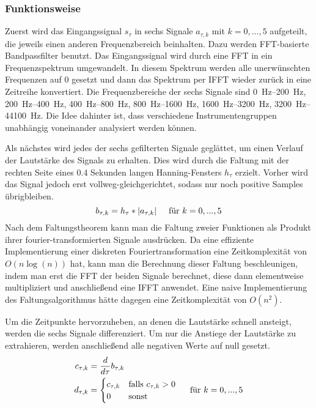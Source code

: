 {{		\subsubsection*{Funktionsweise}
		{
			Zuerst wird das Eingangssignal $s_\tau$ in sechs Signale $a_{\tau, k}$ mit $k = 0, ..., 5$ aufgeteilt,
				die jeweils einen anderen Frequenzbereich beinhalten.
			Dazu werden FFT-basierte Bandpassfilter benutzt.
			Das Eingangssignal wird durch eine FFT in ein Frequenzspektrum umgewandelt.
			In diesem Spektrum werden alle unerwünschten Frequenzen auf \num{0} gesetzt
				und dann das Spektrum per IFFT wieder zurück in eine Zeitreihe konvertiert.
			Die Frequenzbereiche der sechs Signale sind
				\SIrange{0}{200}{\hertz}, \SIrange{200}{400}{\hertz},
				\SIrange{400}{800}{\hertz}, \SIrange{800}{1600}{\hertz},
				\SIrange{1600}{3200}{\hertz}, \SIrange{3200}{44100}{\hertz}.
			Die Idee dahinter ist,
				dass verschiedene Instrumentengruppen unabhängig voneinander analysiert werden können.

			Als nächstes wird jedes der sechs gefilterten Signale geglättet,
				um einen Verlauf der Lautstärke des Signals zu erhalten.
			Dies wird durch die Faltung mit der rechten Seite eines \num{0.4} Sekunden langen Hanning-Fensters $h_\tau$ erzielt.
			Vorher wird das Signal jedoch erst vollweg-gleichgerichtet,
				sodass nur noch positive Samples übrigbleiben.
			\begin{equation}
				b_{\tau, k} = h_\tau * |a_{\tau, k}| \text{\hspace{5mm}für } k = 0, ..., 5
			\end{equation}
			Nach dem Faltungstheorem kann man die Faltung zweier Funktionen als Produkt ihrer fourier-transformierten Signale ausdrücken.
			Da eine effiziente Implementierung einer diskreten Fouriertransformation eine Zeitkomplexität von $O(n\log(n))$ hat,
				kann man die Berechnung dieser Faltung beschleunigen,
				indem man erst die FFT der beiden Signale berechnet,
				diese dann elementweise multipliziert
				und anschlie{\ss}end eine IFFT anwendet.
			Eine naive Implementierung des Faltungsalgorithmus hätte dagegen eine Zeitkomplexität von $O(n^2)$.

			Um die Zeitpunkte hervorzuheben,
				an denen die Lautstärke schnell ansteigt,
				werden die sechs Signale differenziert.
			Um nur die Anstiege der Lautstärke zu extrahieren,
				werden anschlie{\ss}end alle negativen Werte auf null gesetzt.
			\begin{align}
				c_{\tau, k} &= \frac{d}{d\tau} b_{\tau, k} \\
				d_{\tau, k} &=
					\begin{cases}
						c_{\tau, k} & \text{falls } c_{\tau, k} > 0 \\
						0           & \text{sonst}
					\end{cases}
					\text{\hspace{5mm}für } k = 0, ..., 5
			\end{align}

}}}
